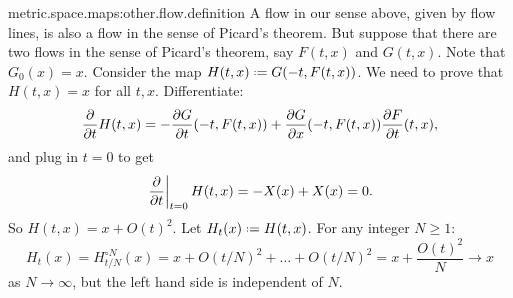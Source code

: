 \begin{answer}{metric.space.maps:other.flow.definition}
A flow in our sense above, given by flow lines, is also a flow in the sense of Picard's theorem.
But suppose that there are two flows in the sense of Picard's theorem, say \(F(t,x)\) and \(G(t,x)\).
Note that \(G_0(x)=x\).
Consider the map \(H(t,x)\defeq G(-t,F(t,x))\).
We need to prove that \(H(t,x)=x\) for all \(t,x\).
Differentiate:
\[
\frac{\partial }{\partial t}H(t,x)
=-\frac{\partial G}{\partial t}(-t,F(t,x))+\frac{\partial G}{\partial x}(-t,F(t,x))\frac{\partial F}{\partial t}(t,x),
\]
and plug in \(t=0\) to get
\[
\left.\frac{\partial }{\partial t}\right|_{t=0}H(t,x)=-X(x)+X(x)=0.
\]
So \(H(t,x)=x+O(t)^2\).
Let \(H_t(x)\defeq H(t,x)\).
For any integer \(N\ge 1\):
\[
H_t(x)=H_{t/N}^{\circ N}(x)=x+O(t/N)^2+\dots+O(t/N)^2=x+\frac{O(t)^2}{N} \to x
\]
as \(N \to \infty\), but the left hand side is independent of \(N\).
\end{answer}

